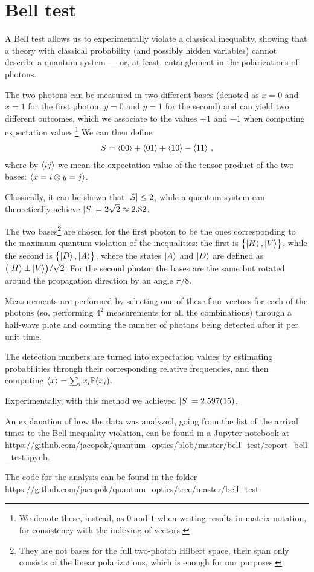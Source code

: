 \documentclass[main.tex]{subfiles}
\begin{document}
\section{Bell test}

A Bell test allows us to experimentally violate a classical inequality, showing that a theory with classical probability (and possibly hidden variables) cannot describe a quantum system --- or, at least, entanglement in the polarizations of photons. 

The two photons can be measured in two different bases (denoted as \(x=0\) and \(x=1\) for the first photon, \(y=0\) and \(y=1\) for the second) and can yield two different outcomes, which we associate to the values \(+1\) and \(-1\) when computing expectation values.\footnote{We denote these, instead, as \(0\) and \(1\) when writing results in matrix notation, for consistency with the indexing of vectors.} We can then define 
%
\begin{align}
S = \expval{00} + \expval{01}+ \expval{10} - \expval{11}
\,,
\end{align}
%
where by \(\expval{ij}\) we mean the expectation value of the tensor product of the two bases: \(\expval{x=i \otimes y=j}\). 

Classically, it can be shown \cite[]{clauserProposedExperimentTest1969} that \(\abs{S} \leq 2\), while a quantum system can theoretically achieve \(\abs{S} = 2 \sqrt{2} \approx \num{2.82}\). 

The two bases\footnote{They are not bases for the full two-photon Hilbert space, their span only consists of the linear polarizations, which is enough for our purposes. } are chosen for the first photon to be the ones corresponding to the maximum quantum violation of the inequalities: the first is \(\qty{\ket{H}, \ket{V}}\), while the second is \(\qty{\ket{D}, \ket{A}}\), where the states \(\ket{A}\) and \(\ket{D}\) are defined as \(\qty(\ket{H} \pm \ket{V}) / \sqrt{2}\).
For the second photon the bases are the same but rotated around the propagation direction by an angle \(\pi /8\).

Measurements are performed by selecting one of these four vectors for each of the photons (so, performing \(4^2\) measurements for all the combinations) through a half-wave plate and counting the number of photons being detected after it per unit time. 

The detection numbers are turned into expectation values by estimating probabilities through their corresponding relative frequencies, and then computing \(\expval{x} = \sum_i x_i \mathbb{P}(x_i)\). 

Experimentally, with this method we achieved \(\abs{S} = \num{2.597(15)}\).

An explanation of how the data was analyzed, going from the list of the arrival times to the Bell inequality violation, can be found in a Jupyter notebook at \url{https://github.com/jacopok/quantum_optics/blob/master/bell_test/report_bell_test.ipynb}.

The code for the analysis can be found in the folder \url{https://github.com/jacopok/quantum_optics/tree/master/bell_test}. 
\end{document}
